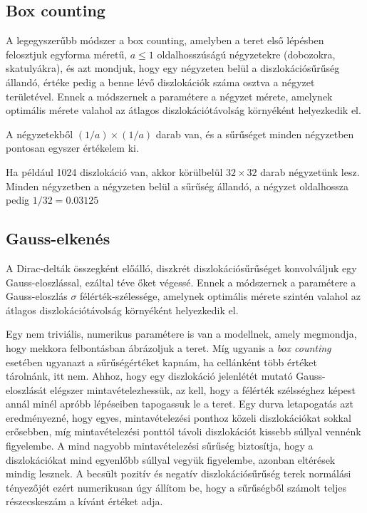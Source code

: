 \documentclass[10pt,a4paper]{scrartcl}
\begin{document}
\subsection{Box counting}
A legegyszerűbb módszer a box counting, amelyben a teret első lépésben felosztjuk egyforma méretű, $a \le 1$ oldalhosszúságú négyzetekre (dobozokra, skatulyákra), és azt mondjuk, hogy egy négyzeten belül a diszlokációsűrűség állandó, értéke pedig a benne lévő diszlokációk száma osztva a négyzet területével. Ennek a módszernek a paramétere a négyzet mérete, amelynek optimális mérete valahol az átlagos diszlokációtávolság környéként helyezkedik el.

A négyzetekből $\left( {1/a} \right) \times \left( {1/a} \right)$ darab van, és a sűrűséget minden négyzetben pontosan egyszer értékelem ki.

Ha például 1024 diszlokáció van, akkor körülbelül $32\times 32$ darab négyzetünk lesz. Minden négyzetben a négyzeten belül a sűrűség állandó, a négyzet oldalhossza pedig $1/32 = 0.03125$

\subsection{Gauss-elkenés}
A Dirac-delták összegként előálló, diszkrét diszlokációsűrűséget konvolváljuk egy Gauss-eloszlással, ezáltal téve őket végessé. Ennek a módszernek a paramétere a Gauss-eloszlás $\sigma$ félérték-szélessége, amelynek optimális mérete szintén valahol az átlagos diszlokációtávolság környéként helyezkedik el.

Egy nem triviális, numerikus paramétere is van a modellnek, amely megmondja, hogy mekkora felbontásban ábrázoljuk a teret. Míg ugyanis a \textit{box counting} esetében ugyanazt a sűrűségértéket kapnám, ha cellánként több értéket tárolnánk, itt nem. Ahhoz, hogy egy diszlokáció jelenlétét mutató Gauss-eloszlását elégszer mintavételezhessük, az kell, hogy a félérték szélsséghez képest annál minél apróbb lépéseiben tapogassuk le a teret. Egy durva letapogatás azt eredményezné, hogy egyes, mintavételezési ponthoz közeli diszlokációkat sokkal erősebben, míg mintavételezési ponttól távoli diszlokációt kissebb súllyal vennénk figyelembe. A mind nagyobb mintavételezési sűrűség biztosítja, hogy a diszlokációkat mind egyenlőbb súllyal vegyük figyelembe, azonban eltérések mindig lesznek. A becsült pozitív és negatív diszlokációsűrűség terek normálási tényezőjét ezért numerikusan úgy állítom be, hogy a sűrűségből számolt teljes részecskeszám a kívánt értéket adja.
\end{document}
